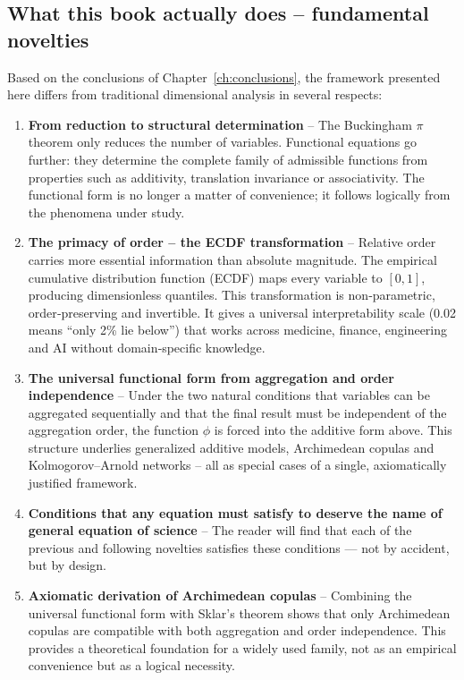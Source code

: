 \subsection*{What this book actually does – fundamental novelties}

Based on the conclusions of Chapter~\ref{ch:conclusions}, the framework presented here differs from traditional dimensional analysis in several respects:

\begin{enumerate}
    \item \textbf{From reduction to structural determination} – The Buckingham \(\pi\) theorem only reduces the number of variables. Functional equations go further: they determine the complete family of admissible functions from properties such as additivity, translation invariance or associativity. The functional form is no longer a matter of convenience; it follows logically from the phenomena under study.

    \item \textbf{The primacy of order – the ECDF transformation} – Relative order carries more essential information than absolute magnitude. The empirical cumulative distribution function (ECDF) maps every variable to \([0,1]\), producing dimensionless quantiles. This transformation is non‑parametric, order‑preserving and invertible. It gives a universal interpretability scale (0.02 means “only 2\% lie below”) that works across medicine, finance, engineering and AI without domain‑specific knowledge.

    \item \textbf{The universal functional form from aggregation and order independence} – Under the two natural conditions that variables can be aggregated sequentially and that the final result must be independent of the aggregation order, the function \(\phi\) is forced into the additive form above. This structure underlies generalized additive models, Archimedean copulas and Kolmogorov–Arnold networks – all as special cases of a single, axiomatically justified framework.



    \item \textbf{Conditions that any equation must satisfy to deserve the name of general equation of science} –  The reader will find that each of the previous and following novelties satisfies these conditions — not by accident, but by design.


    \item \textbf{Axiomatic derivation of Archimedean copulas} – Combining the universal functional form with Sklar’s theorem shows that only Archimedean copulas are compatible with both aggregation and order independence. This provides a theoretical foundation for a widely used family, not as an empirical convenience but as a logical necessity.


\end{enumerate}
